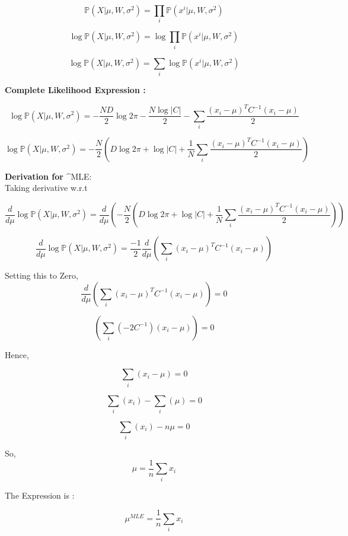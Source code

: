 \documentclass[a4paper,11pt]{article}
\begin{document}
\begin{mlsolution}
\[
\mathbb{P}(X | \mu, W, \sigma^2) = \prod_i\mathbb{P}(x^i | \mu, W, \sigma^2) 
\]

\[
\log \mathbb{P}(X | \mu, W, \sigma^2) = \log \prod_i\mathbb{P}(x^i | \mu, W, \sigma^2) 
\]

\[
\log \mathbb{P}(X | \mu, W, \sigma^2) = \sum_i \log \mathbb{P}(x^i | \mu, W, \sigma^2) 
\]

\textbf{Complete Likelihood Expression : }

\[
\log \mathbb{P}(X | \mu, W, \sigma^2) =-\frac{ND}{2}\log2\pi - \frac{N\log|C|}{2} - \sum_i\frac{(x_i - \mu)^TC^{-1}(x_i - \mu)}{2}
\]

\[
\log \mathbb{P}(X | \mu, W, \sigma^2) =-\frac{N}{2} \left ( D\log2\pi + \log|C| + \frac{1}{N}\sum_i\frac{(x_i - \mu)^TC^{-1}(x_i - \mu)}{2} \right )
\]

\textbf{Derivation for } \textbf{\mu}^{MLE}:\\

Taking derivative w.r.t \mu

\[
\frac{d}{d\mu} \log \mathbb{P}(X | \mu, W, \sigma^2) = \frac{d}{d\mu} \left ( -\frac{N}{2} \left ( D\log2\pi + \log|C| + \frac{1}{N}\sum_i\frac{(x_i - \mu)^TC^{-1}(x_i - \mu)}{2} \right ) \right )
\]

\[
\frac{d}{d\mu} \log \mathbb{P}(X | \mu, W, \sigma^2) = \frac{-1}{2} \frac{d}{d\mu} \left ( \sum_i (x_i - \mu)^TC^{-1}(x_i - \mu) \right )
\]

Setting this to Zero,
\[
\frac{d}{d\mu} \left ( \sum_i (x_i - \mu)^TC^{-1}(x_i - \mu) \right ) = 0
\]

\[
\left ( \sum_i (-2 C^{-1})(x_i - \mu) \right ) = 0
\]

Hence,

\[
\sum_i (x_i - \mu) = 0
\]

\[
\sum_i (x_i) - \sum_i (\mu) = 0
\]

\[
\sum_i (x_i) - n\mu = 0
\]

So,
\[
\mu = \frac{1}{n}\sum_i x_i
\]

The Expression is :

\[
\mu^{MLE} = \frac{1}{n}\sum_i x_i
\]

\end{mlsolution}
\end{document}
